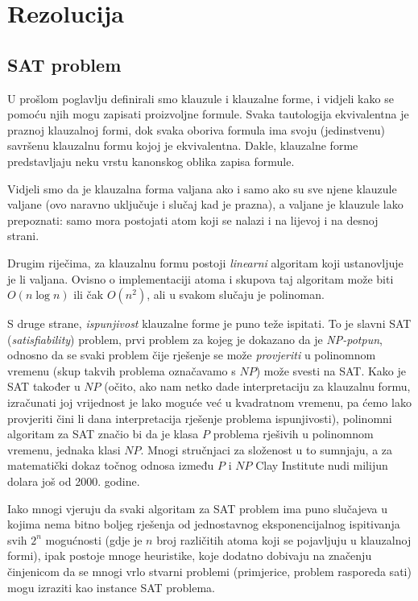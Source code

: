 \chapter{Rezolucija}

\section{SAT problem}

U prošlom poglavlju definirali smo klauzule i klauzalne forme, i vidjeli kako se pomoću njih mogu zapisati proizvoljne formule. Svaka tautologija ekvivalentna je praznoj klauzalnoj formi, dok svaka oboriva formula ima svoju (jedinstvenu) savršenu klauzalnu formu kojoj je ekvivalentna. Dakle, klauzalne forme predstavljaju neku vrstu kanonskog oblika zapisa formule.

Vidjeli smo da je klauzalna forma valjana ako i samo ako su sve njene klauzule valjane (ovo naravno uključuje i slučaj kad je prazna), a valjane je klauzule lako prepoznati: samo mora postojati atom koji se nalazi i na lijevoj i na desnoj strani.

Drugim riječima, za klauzalnu formu postoji \emph{linearni} algoritam koji ustanovljuje je li valjana. Ovisno o implementaciji atoma i skupova taj algoritam može biti $O(n\log n)$ ili čak $O(n^2)$, ali u svakom slučaju je polinoman.

S druge strane, \emph{ispunjivost} klauzalne forme je puno teže ispitati. To je slavni SAT (\emph{satisfiability}) problem, prvi problem za kojeg je dokazano da je \emph{NP-potpun}, odnosno da se svaki problem čije rješenje se može \emph{provjeriti} u polinomnom vremenu (skup takvih problema označavamo s $NP$) može svesti na SAT. Kako je SAT također u $NP$ (očito, ako nam netko dade interpretaciju za klauzalnu formu, izračunati joj vrijednost je lako moguće već u kvadratnom vremenu, pa ćemo lako provjeriti čini li dana interpretacija rješenje problema ispunjivosti), polinomni algoritam za SAT značio bi da je klasa $P$ problema rješivih u polinomnom vremenu, jednaka klasi $NP$. Mnogi stručnjaci za složenost u to sumnjaju, a za matematički dokaz točnog odnosa između $P$ i $NP$ Clay Institute nudi milijun dolara još od 2000. godine.

Iako mnogi vjeruju da svaki algoritam za SAT problem ima puno slučajeva u kojima nema bitno boljeg rješenja od jednostavnog eksponencijalnog ispitivanja svih $2^n$ mogućnosti (gdje je $n$ broj različitih atoma koji se pojavljuju u klauzalnoj formi), ipak postoje mnoge heuristike, koje dodatno dobivaju na značenju činjenicom da se mnogi vrlo stvarni problemi (primjerice, problem rasporeda sati) mogu izraziti kao instance SAT problema.

